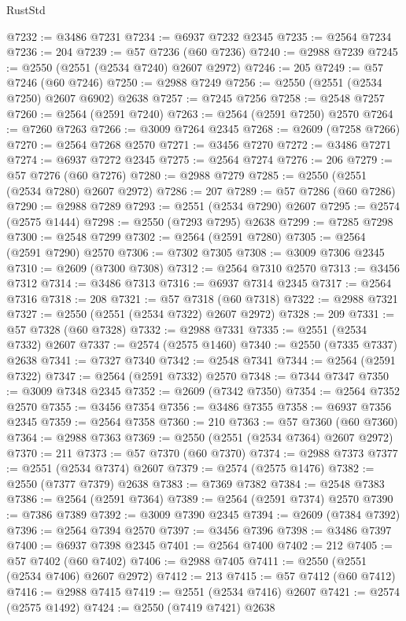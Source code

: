 \begin{lexlean}{RustStd}
\begin{coremodule}
@7232 := @3486 @7231
@7234 := @6937 @7232 @2345
@7235 := @2564 @7234
@7236 := 204
@7239 := @57 @7236 (@60 @7236)
@7240 := @2988 @7239
@7245 := @2550 (@2551 (@2534 @7240) @2607 @2972)
@7246 := 205
@7249 := @57 @7246 (@60 @7246)
@7250 := @2988 @7249
@7256 := @2550 (@2551 (@2534 @7250) @2607 @6902) @2638
@7257 := @7245 @7256
@7258 := @2548 @7257
@7260 := @2564 (@2591 @7240)
@7263 := @2564 (@2591 @7250) @2570
@7264 := @7260 @7263
@7266 := @3009 @7264 @2345
@7268 := @2609 (@7258 @7266)
@7270 := @2564 @7268 @2570
@7271 := @3456 @7270
@7272 := @3486 @7271
@7274 := @6937 @7272 @2345
@7275 := @2564 @7274
@7276 := 206
@7279 := @57 @7276 (@60 @7276)
@7280 := @2988 @7279
@7285 := @2550 (@2551 (@2534 @7280) @2607 @2972)
@7286 := 207
@7289 := @57 @7286 (@60 @7286)
@7290 := @2988 @7289
@7293 := @2551 (@2534 @7290) @2607
@7295 := @2574 (@2575 @1444)
@7298 := @2550 (@7293 @7295) @2638
@7299 := @7285 @7298
@7300 := @2548 @7299
@7302 := @2564 (@2591 @7280)
@7305 := @2564 (@2591 @7290) @2570
@7306 := @7302 @7305
@7308 := @3009 @7306 @2345
@7310 := @2609 (@7300 @7308)
@7312 := @2564 @7310 @2570
@7313 := @3456 @7312
@7314 := @3486 @7313
@7316 := @6937 @7314 @2345
@7317 := @2564 @7316
@7318 := 208
@7321 := @57 @7318 (@60 @7318)
@7322 := @2988 @7321
@7327 := @2550 (@2551 (@2534 @7322) @2607 @2972)
@7328 := 209
@7331 := @57 @7328 (@60 @7328)
@7332 := @2988 @7331
@7335 := @2551 (@2534 @7332) @2607
@7337 := @2574 (@2575 @1460)
@7340 := @2550 (@7335 @7337) @2638
@7341 := @7327 @7340
@7342 := @2548 @7341
@7344 := @2564 (@2591 @7322)
@7347 := @2564 (@2591 @7332) @2570
@7348 := @7344 @7347
@7350 := @3009 @7348 @2345
@7352 := @2609 (@7342 @7350)
@7354 := @2564 @7352 @2570
@7355 := @3456 @7354
@7356 := @3486 @7355
@7358 := @6937 @7356 @2345
@7359 := @2564 @7358
@7360 := 210
@7363 := @57 @7360 (@60 @7360)
@7364 := @2988 @7363
@7369 := @2550 (@2551 (@2534 @7364) @2607 @2972)
@7370 := 211
@7373 := @57 @7370 (@60 @7370)
@7374 := @2988 @7373
@7377 := @2551 (@2534 @7374) @2607
@7379 := @2574 (@2575 @1476)
@7382 := @2550 (@7377 @7379) @2638
@7383 := @7369 @7382
@7384 := @2548 @7383
@7386 := @2564 (@2591 @7364)
@7389 := @2564 (@2591 @7374) @2570
@7390 := @7386 @7389
@7392 := @3009 @7390 @2345
@7394 := @2609 (@7384 @7392)
@7396 := @2564 @7394 @2570
@7397 := @3456 @7396
@7398 := @3486 @7397
@7400 := @6937 @7398 @2345
@7401 := @2564 @7400
@7402 := 212
@7405 := @57 @7402 (@60 @7402)
@7406 := @2988 @7405
@7411 := @2550 (@2551 (@2534 @7406) @2607 @2972)
@7412 := 213
@7415 := @57 @7412 (@60 @7412)
@7416 := @2988 @7415
@7419 := @2551 (@2534 @7416) @2607
@7421 := @2574 (@2575 @1492)
@7424 := @2550 (@7419 @7421) @2638

\end{coremodule}
\end{lexlean}
